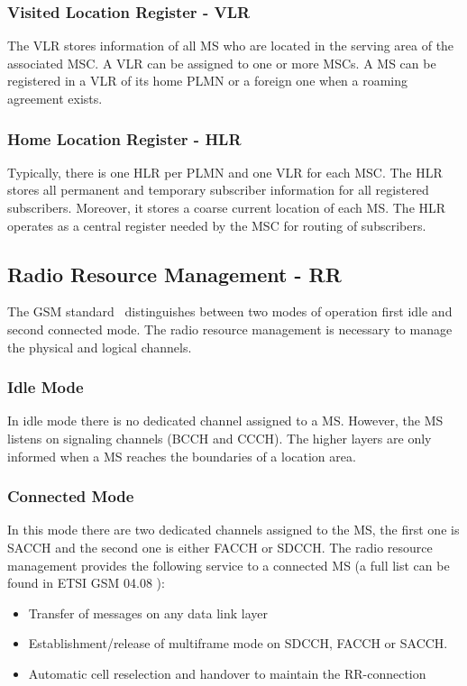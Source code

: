 \documentclass[master,english]{hgbthesis}
\begin{document}
\subsubsection{Visited Location Register - VLR}
The VLR stores information of all MS who are located in the serving area of the associated MSC. A VLR can be assigned to one or more MSCs. A MS can be registered in a VLR of its home PLMN or a foreign one when a roaming agreement exists.
\subsubsection{Home Location Register - HLR}
Typically, there is one HLR per PLMN and one VLR for each MSC. The HLR stores all permanent and temporary subscriber information for all registered subscribers. Moreover, it stores a coarse current location of each MS. The HLR operates as a central register needed by the MSC for routing of subscribers.
\subsection{Radio Resource Management - RR}
The GSM standard~\cite{Etsi1994} distinguishes between two modes of operation first idle and second connected mode. The radio resource management is necessary to manage the physical and logical channels. 
\subsubsection{Idle Mode}
In idle mode there is no dedicated channel assigned to a MS. However, the MS listens on signaling channels (BCCH and CCCH). The higher layers are only informed when a MS reaches the boundaries of a location area.
\subsubsection{Connected Mode}
\label{subsub:connected}
In this mode there are two dedicated channels assigned to the MS, the first one is SACCH and the second one is either FACCH or SDCCH. 
The radio resource management provides the following service to a connected MS (a full list can be found in ETSI GSM 04.08 \cite{Etsi1994}):
\begin{itemize}
	\item Transfer of messages on any data link layer
	\item Establishment/release of multiframe mode on SDCCH, FACCH or SACCH.
	\item Automatic cell reselection and handover to maintain the RR-connection
\end{itemize}
\end{document}
